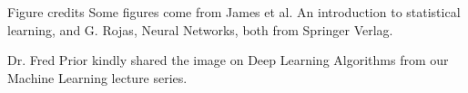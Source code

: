 \documentclass[11pt, aspectratio=43]{beamer}
\begin{document}
	
	\begin{frame}{Figure credits}
		Some figures come from James et al. An introduction to statistical learning, and G. Rojas, Neural Networks, both from Springer Verlag. 
		
		Dr. Fred Prior kindly shared the image on Deep Learning Algorithms from our Machine Learning lecture series.


		
	\end{frame}
	
%		
%		
	
\end{document}
